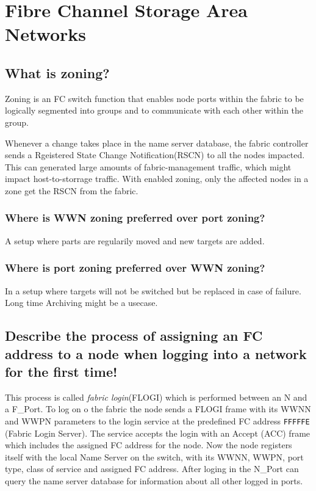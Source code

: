 \section{Fibre Channel Storage Area Networks} %
\label{sec:fibre_channel_storage_area_networks}

\subsection{What is zoning?} %
\label{sub:what_is_zoning}
	Zoning is an FC switch function
	that enables node ports within the fabric to be logically segmented
	into groups and to communicate with each other within the group.

	Whenever a change takes place in the name server database,
	the fabric controller sends a Rgeistered State Change Notification(RSCN)
	to all the nodes impacted.
	This can generated large amounts of fabric-management traffic,
	which might impact host-to-storrage traffic.
	With enabled zoning,
	only the affected nodes in a zone get the RSCN from the fabric.

\subsubsection{Where is WWN zoning preferred over port zoning?} %
\label{ssub:where_is_wwn_zoning_preferred_over_port_zoning}
	A setup where parts are regularily moved
	and new targets are added.

\subsubsection{Where is port zoning preferred over WWN zoning?} %
\label{ssub:where_is_port_zoning_preferred_over_wwn_zoning}
	In a setup where targets will not be switched
	but be replaced in case of failure.
	Long time Archiving might be a usecase.	

\subsection{Describe the process of assigning an FC address to a node when logging into a network for the first time!} %
\label{sub:describe_the_process_of_assigning_an_fc_address_to_a_node_when_logging_into_a_network_for_the_first_time}
	This process is called \emph{fabric login}(FLOGI) which is performed between an N and a F\_Port.
	To log on o the fabric the node sends a FLOGI frame with its WWNN and WWPN parameters
	to the login service at the predefined FC address \texttt{FFFFFE} (Fabric Login Server).
	The service accepts the login with an Accept (ACC) frame
	which includes the assigned FC address for the node.
	Now the node registers itself with the local Name Server on the switch,
	with its WWNN, WWPN, port type, class of service and assigned FC address.
	After loging in the N\_Port can query the name server database for information
	about all other logged in ports.

